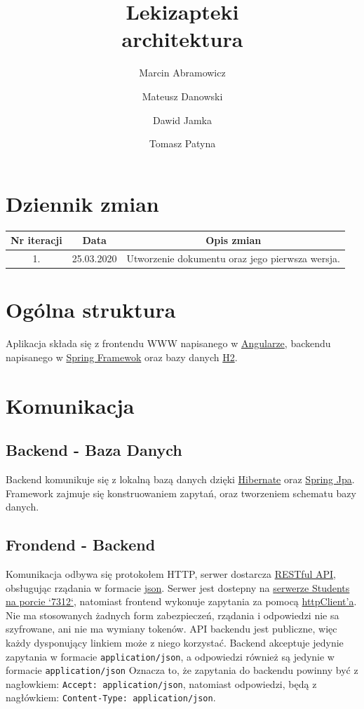 \documentclass{article}
\title{
Lekizapteki\\
\large architektura}
\author{Marcin Abramowicz \and Mateusz Danowski \and Dawid Jamka \and Tomasz Patyna}
\begin{document}
  \maketitle

  \section{Dziennik zmian}
    \begin{tabular}{|c|c|c|}
      Nr iteracji & Data & Opis zmian \\
      \hline
      1. & 25.03.2020 & Utworzenie dokumentu oraz jego pierwsza wersja. \\
    \end{tabular}

  \section{Ogólna struktura}
    Aplikacja składa się z frontendu WWW napisanego w
    \href{https://angular.io}{Angularze}, backendu napisanego w
    \href{https://spring.io}{Spring Framewok} oraz bazy danych
    \href {https://www.h2database.com/html/main.html}{H2}.

  \section{Komunikacja}
    \subsection{Backend - Baza Danych}
    Backend komunikuje się z lokalną bazą danych dzięki
    \href{https://hibernate.org}{Hibernate} oraz
    \href{https://spring.io/projects/spring-data-jpa} {Spring Jpa}.
    Framework zajmuje się konstruowaniem zapytań, oraz tworzeniem schematu bazy danych.

    \subsection{Frondend - Backend}
    Komunikacja odbywa się protokołem HTTP, serwer dostarcza
    \href{https://en.wikipedia.org/wiki/Representational_state_transfer}{RESTful API},
    obsługując rządania w formacie
    \href{https://en.wikipedia.org/wiki/JSON}{json}.
    Serwer jest dostepny na
    \href{http://students.mimuw.edu.pl:7312}{serwerze Students na porcie `7312`},
    natomiast frontend wykonuje zapytania za pomocą
    \href{https://angular.io/guide/http}{httpClient'a}.
    Nie ma stosowanych żadnych form zabezpieczeń, rządania i odpowiedzi nie sa szyfrowane, ani nie ma wymiany tokenów.
    API backendu jest publiczne, więc każdy dysponujący linkiem może z niego korzystać.
    Backend akceptuje jedynie zapytania w formacie \texttt{application/json},
    a odpowiedzi również są jedynie w formacie \texttt{application/json}
    Oznacza to, że zapytania do backendu powinny być z nagłowkiem: \texttt{Accept: application/json},
    natomiast odpowiedzi, będą z nagłówkiem: \texttt{Content-Type: application/json}.
\end{document}
